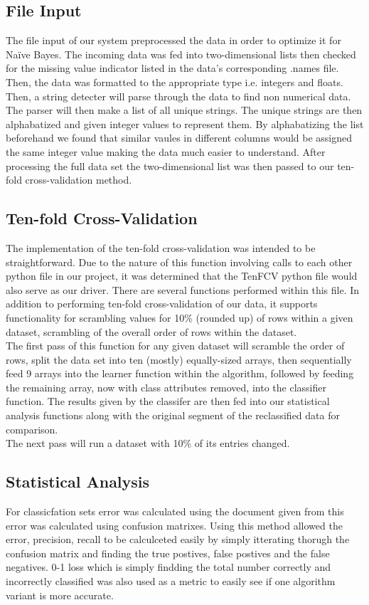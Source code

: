 \documentclass[twoside,11pt]{article}
\begin{document}
\subsection{File Input}
The file input of our system preprocessed the data in order to optimize it for Naïve Bayes. 
The incoming data was fed into two-dimensional lists then checked for the missing value indicator
listed in the data's corresponding .names file. Then, the data was formatted to the appropriate 
type i.e. integers and floats. Then, a string detecter will parse through the data to find
non numerical data. The parser will then make a list of all unique strings. The unique strings 
are then alphabatized and given integer values to represent them. By alphabatizing the list
beforehand we found that similar vaules in different columns would be assigned the same integer
value making the data much easier to understand. After processing the full data set the two-dimensional
 list was then passed to our ten-fold cross-validation method.  
\subsection{Ten-fold Cross-Validation}

The implementation of the ten-fold cross-validation was intended to be straightforward. 
Due to the nature of this function involving calls to each other python file in our 
project, it was determined that the TenFCV python file would also serve as our driver. 
There are several functions performed within this file. In addition to performing 
ten-fold cross-validation of our data, it supports functionality for scrambling values for 
10\% (rounded up) of rows within a given dataset, scrambling of the overall order of 
rows within the dataset.\\
The first pass of this function for any given dataset will scramble the order of rows, 
split the data set into ten (mostly) equally-sized arrays, then sequentially feed 9 arrays 
into the learner function within the algorithm, followed by feeding the remaining array, 
now with class attributes removed, into the classifier function. The results given by 
the classifer are then fed into our statistical analysis functions along with the original 
segment of the reclassified data for comparison.\\
The next pass will run a dataset with 10\% of its entries changed.\\


\subsection{Statistical Analysis}
For classicfation sets error was calculated using the document given \citep{Precision} from this error 
was calculated using confusion matrixes. Using this method allowed the error, precision, recall to be 
calculceted easily by simply itterating thorugh the confusion matrix and finding the true postives, 
false postives and the false negatives. 0-1 loss which is simply findding the total number correctly and incorrectly 
classified was also used as a metric to easily see if one algorithm variant is more accurate.
\end{document}
